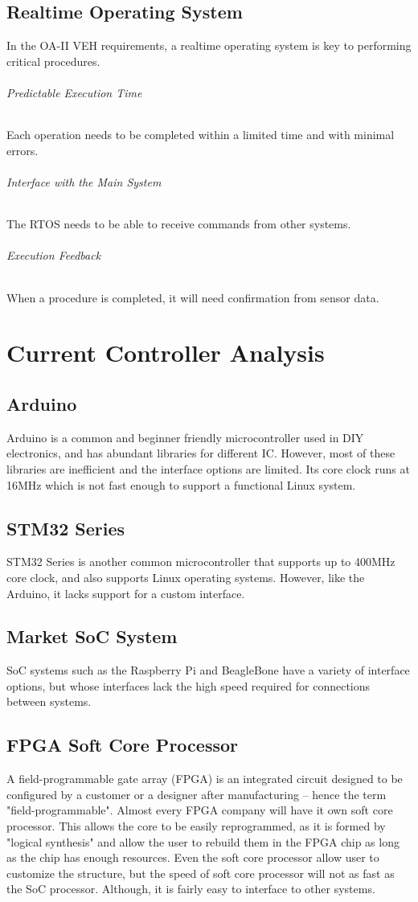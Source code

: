 \documentclass[12pt,article]{memoir}
\begin{document}
\section{Realtime Operating System}
In the OA-II VEH requirements, a realtime operating system is key to performing critical procedures.\cite{wiki:RTOS}
\subparagraph{Predictable Execution Time}Each operation needs to be completed within a limited time and with minimal errors.
\subparagraph{Interface with the Main System}The RTOS needs to be able to receive commands from other systems.
\subparagraph{Execution Feedback}When a procedure is completed, it will need confirmation from sensor data.
\newpage
\chapter{Current Controller Analysis}
\section{Arduino}
Arduino is a common and beginner friendly microcontroller used in DIY electronics, and has abundant libraries for different IC.\cite{offical:Arduino} However, most of these libraries are inefficient and the interface options are limited. Its core clock runs at 16MHz which is not fast enough to support a functional Linux system.
\section{STM32 Series}
STM32 Series is another common microcontroller that supports up to 400MHz core clock, and also supports Linux operating systems.\cite{offical:STM32} However, like the Arduino, it lacks support for a custom interface.
\section{Market SoC System}
SoC systems such as the Raspberry Pi and BeagleBone have a variety of interface options, but whose interfaces lack the high speed required for connections between systems.\cite{offical:Beagles}
\section{FPGA Soft Core Processor}
A field-programmable gate array (FPGA) is an integrated circuit designed to be configured by a customer or a designer after manufacturing – hence the term "field-programmable".\cite{wiki:FPGA} Almost every FPGA company will have it own soft core processor. This allows the core to be easily reprogrammed, as it is formed by "logical synthesis" and allow the user to rebuild them in the FPGA chip as long as the chip has enough resources. Even the soft core processor allow user to customize the structure, but the speed of soft core processor will not as fast as the SoC processor. Although, it is fairly easy to interface to other systems.
\end{document}
